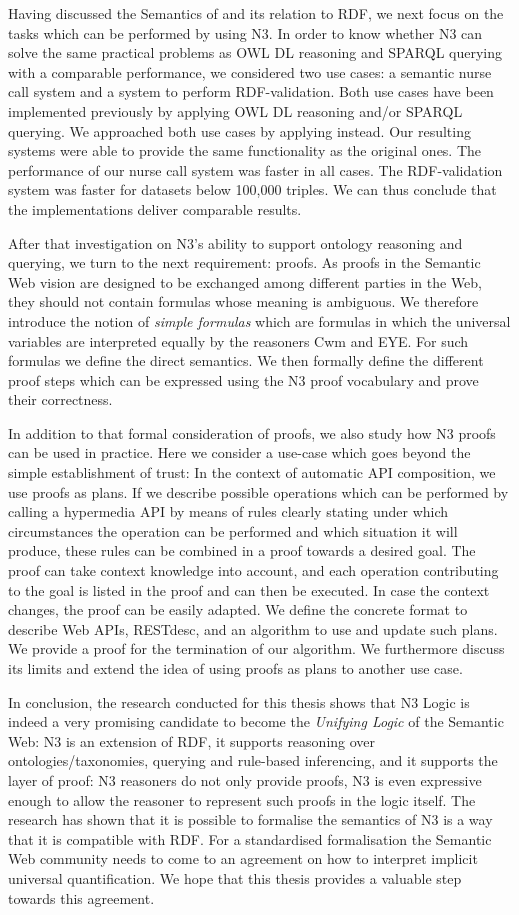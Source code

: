 Having discussed the Semantics of \nthree and its relation to RDF, we next focus on the tasks which can be performed by using N3. In order to know 
whether N3 can solve the same practical problems as OWL DL reasoning and SPARQL querying with a comparable performance, we considered two use cases: a semantic nurse call 
system and a system to perform RDF-validation. Both use cases have been implemented previously by applying OWL DL reasoning and/or SPARQL querying.
We approached both use cases by applying \nthree instead. Our resulting systems were able to provide the same functionality as the original ones.
The performance of our nurse call system was faster in all cases.  
The RDF-validation system was faster for datasets below 100,000 triples. We can thus conclude that the implementations deliver comparable results.

After that investigation on N3's ability to support ontology reasoning and querying, we turn to the next requirement: proofs. 
As proofs in the Semantic Web vision are designed to be exchanged among different parties in the Web, they should not contain formulas whose meaning is ambiguous.
We therefore introduce the notion of \emph{simple formulas} which are formulas in which the universal variables are interpreted equally by the reasoners Cwm and EYE. 
For such formulas we define the direct semantics. We then formally define the different proof steps which can be expressed 
using the N3 proof vocabulary and prove their correctness.

In addition to that formal consideration of proofs, we also study how N3 proofs can be used in practice. Here we consider a use-case which goes beyond the simple establishment of trust:
In the context of automatic API composition, we use proofs as plans. If we describe possible operations
which can be performed by calling a hypermedia API by means of rules clearly stating under which circumstances 
 the operation can be performed and which situation it will produce, these rules can be combined in a proof towards a desired goal.
The proof can take context knowledge into account, and each operation contributing to the goal is listed in the proof and can then be executed. In case the context changes,
the proof can be easily adapted. We define the concrete format to describe Web APIs, RESTdesc, and an algorithm to use and update such plans. We provide a proof for 
the termination of our algorithm. We furthermore discuss its limits and extend the idea of using proofs as plans to another use case.

In conclusion, the research conducted for this thesis shows that N3 Logic is indeed a very promising candidate to become the \emph{Unifying Logic} of the Semantic Web:
N3 is an extension of RDF, it supports reasoning over ontologies/taxonomies, querying and rule-based inferencing, and it supports the layer
of proof: N3 reasoners do not only provide proofs, N3 is even expressive enough to allow the reasoner to represent such proofs in the logic itself. 
The research has shown that it is possible 
to formalise the semantics of N3 is a way that it is compatible with RDF. For a standardised formalisation the Semantic Web community needs to 
come to an agreement on how to interpret implicit universal quantification. We hope that this thesis provides a valuable step towards this agreement.
